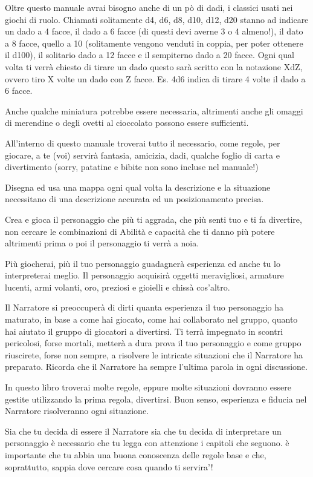 \documentclass[a4paper,11pt,twoside,openany]{book}
\begin{document}
Oltre questo manuale avrai bisogno anche di un pò di dadi, i classici usati nei giochi di ruolo.
Chiamati solitamente d4, d6, d8, d10, d12, d20 stanno ad indicare un dado a 4 facce, il dado a 6 facce (di questi devi averne 3 o 4 almeno!), il dato a 8 facce, quello a 10 (solitamente vengono venduti in coppia, per poter ottenere il d100), il solitario dado a 12 facce e il sempiterno dado a 20 facce.
Ogni qual volta ti verrà chiesto di tirare un dado questo sarà scritto con la notazione XdZ, ovvero tiro X volte un dado con Z facce. Es. 4d6 indica di tirare 4 volte il dado a 6 facce.

Anche qualche miniatura potrebbe essere necessaria, altrimenti anche gli omaggi di merendine o degli ovetti al cioccolato possono essere sufficienti.

All'interno di questo manuale troverai tutto il necessario, come regole, per giocare, a te (voi) servirà fantasia, amicizia, dadi, qualche foglio di carta e divertimento (sorry, patatine e bibite non sono incluse nel manuale!)

Disegna ed usa una mappa ogni qual volta la descrizione e la situazione necessitano di una descrizione accurata ed un posizionamento precisa. 

Crea e gioca il personaggio che più ti aggrada, che più senti tuo e ti fa divertire, non cercare le combinazioni di Abilità e capacità che ti danno più potere altrimenti prima o poi il personaggio ti verrà a noia.

Più giocherai, più il tuo personaggio guadagnerà esperienza ed anche tu lo interpreterai meglio. Il personaggio acquisirà oggetti meravigliosi, armature lucenti, armi volanti, oro, preziosi e gioielli e chissà cos'altro.

Il Narratore si preoccuperà di dirti quanta esperienza il tuo personaggio ha maturato, in base a come hai giocato, come hai collaborato nel gruppo, quanto hai aiutato il gruppo di giocatori a divertirsi. Ti terrà impegnato in scontri pericolosi, forse mortali, metterà a dura prova il tuo personaggio e come gruppo riuscirete, forse non sempre, a risolvere le intricate situazioni che il Narratore ha preparato. Ricorda che il Narratore ha sempre l'ultima parola in ogni discussione.

In questo libro troverai molte regole, eppure molte situazioni dovranno essere gestite utilizzando la prima regola, divertirsi. Buon senso, esperienza e fiducia nel Narratore risolveranno ogni situazione.

Sia che tu decida di essere il Narratore sia che tu decida di interpretare un personaggio è necessario che tu legga con attenzione i capitoli che seguono.
è importante che tu abbia una buona conoscenza delle regole base e che, soprattutto, sappia dove cercare cosa quando ti servira'!
\end{document}
